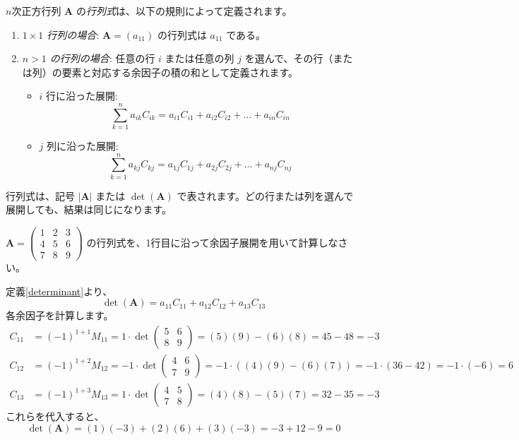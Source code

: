 \begin{dfn} \label{determinant}
$n$次正方行列 $\bm{A}$ の\emph{行列式}は、以下の規則によって定義されます。
\begin{enumerate}
    \item \emph{$1 \times 1$ 行列の場合}: $\bm{A} = (a_{11})$ の行列式は $a_{11}$ である。
    \item \emph{$n > 1$ の行列の場合}: 任意の行 $i$ または任意の列 $j$ を選んで、その行（または列）の要素と対応する余因子の積の和として定義されます。
    \begin{itemize}
        \item $i$ 行に沿った展開:
        \[ \sum_{k=1}^{n} a_{ik}C_{ik} = a_{i1}C_{i1} + a_{i2}C_{i2} + \dots + a_{in}C_{in} \]
        \item $j$ 列に沿った展開:
        \[ \sum_{k=1}^{n} a_{kj}C_{kj} = a_{1j}C_{1j} + a_{2j}C_{2j} + \dots + a_{nj}C_{nj} \]
    \end{itemize}
\end{enumerate}
行列式は、記号 $|\bm{A}|$ または $\det(\bm{A})$ で表されます。どの行または列を選んで展開しても、結果は同じになります。
\end{dfn}

\begin{ex} \label{det_1..9}
$\bm{A} = \begin{pmatrix} 1 & 2 & 3 \\ 4 & 5 & 6 \\ 7 & 8 & 9 \end{pmatrix}$ の行列式を、1行目に沿って余因子展開を用いて計算しなさい。\par
定義\ref{determinant}より、
\[ \det(\bm{A}) = a_{11}C_{11} + a_{12}C_{12} + a_{13}C_{13} \]
各余因子を計算します。
\begin{align*}
C_{11} &= (-1)^{1+1} M_{11} = 1 \cdot \det\begin{pmatrix} 5 & 6 \\ 8 & 9 \end{pmatrix} = (5)(9) - (6)(8) = 45 - 48 = -3 \\
C_{12} &= (-1)^{1+2} M_{12} = -1 \cdot \det\begin{pmatrix} 4 & 6 \\ 7 & 9 \end{pmatrix} = -1 \cdot ((4)(9) - (6)(7)) = -1 \cdot (36 - 42) = -1 \cdot (-6) = 6 \\
C_{13} &= (-1)^{1+3} M_{13} = 1 \cdot \det\begin{pmatrix} 4 & 5 \\ 7 & 8 \end{pmatrix} = (4)(8) - (5)(7) = 32 - 35 = -3
\end{align*}
これらを代入すると、
\[ \det(\bm{A}) = (1)(-3) + (2)(6) + (3)(-3) = -3 + 12 - 9 = 0 \]
\end{ex}

